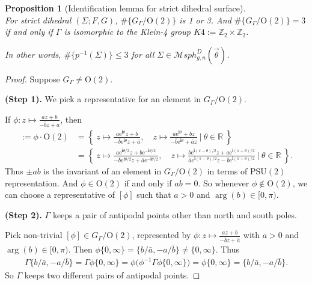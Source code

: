 \documentclass[pdflatex,sn-mathphys]{sn-jnl}%
\numberwithin{equation}{section}
\theoremstyle{thmstyleone}%
\newtheorem{proposition}[theorem]{Proposition}%
\newcommand{\RR}{\mathbb{R}}
\newcommand{\ZZ}{\mathbb{Z}}
\newcommand{\ii}{\mathbf{i}}
\newcommand{\PSUtwo}{\mathrm{PSU}(2)}
\newcommand{\Otwo}{\mathrm{O}(2)}
\newcommand{\MsphgnD}{\mathcal{M}sph^D_{g,n}(\vec{\theta})}
\begin{document}
\begin{proposition}[Identification lemma for strict dihedral surface]\label{prop:id_SDhd} ~\\
    For strict dihedral $(\Sigma;F,G)$, $\#\{ G_\Gamma/\Otwo \}$ is 1 or 3. And $\#\{ G_\Gamma/\Otwo \}=3$ if and only if $\Gamma$ is isomorphic to the Klein-4 group $K4:= \ZZ_2 \times \ZZ_2$.

    In other words, $\#\{p^{-1}(\Sigma)\} \leq 3$ for all $\Sigma\in\MsphgnD$.
\end{proposition}
\begin{proof}
    Suppose $G_\Gamma\neq \Otwo$.

\textbf{(Step 1).} We pick a representative for an element in $G_\Gamma/\Otwo$.

If $\phi:z\mapsto \frac{az+b}{-\bar{b}z+\bar{a}} $, then
\begin{align*}
    [\phi]:=\phi\cdot\Otwo &= \left\{\ z\mapsto \frac{a\mathrm{e}^{\ii\theta}z+b}{-\bar{b}\mathrm{e}^{\ii\theta}z+\bar{a}},\quad z\mapsto \frac{a\mathrm{e}^{\ii\theta}+bz}{-\bar{b}\mathrm{e}^{\ii\theta}+\bar{a}z} \ \bigg\rvert\ \theta\in\RR \ \right\} \\
    & = \left\{\ z\mapsto \frac{a\mathrm{e}^{\ii\theta/2}z+b\mathrm{e}^{-\ii\theta/2}}{-\bar{b}\mathrm{e}^{\ii\theta/2}z+\bar{a}\mathrm{e}^{-\ii\theta/2}},\quad z\mapsto \frac{b\mathrm{e}^{\ii(\pi-\theta)/2}z+a\mathrm{e}^{\ii(\pi+\theta)/2}}{\bar{a}\mathrm{e}^{\ii(\pi-\theta)/2}z-\bar{b}\mathrm{e}^{\ii(\pi+\theta)/2}} \ \bigg\rvert\ \theta\in\RR \ \right\}.
\end{align*}
Thus $\pm ab$ is the invariant of an element in $G_\Gamma/\Otwo$ in terms of $\PSUtwo$ representation. And $\phi\in\Otwo$ if and only if $ab=0$. So whenever $\phi\notin\Otwo$, we can choose a representative of $[\phi]$ such that $a>0$ and $\arg(b)\in[0,\pi)$.

\medskip
\textbf{(Step 2).} $\Gamma$ keeps a pair of antipodal points other than north and south poles.

Pick non-trivial $[\phi]\in G_\Gamma/\Otwo$, represented by $\phi:z\mapsto \frac{az+b}{-\bar{b}z+\bar{a}} $ with $a>0$ and $\arg(b)\in[0,\pi)$. Then $\phi\{0,\infty\} = \{b/\bar{a}, -a/\bar{b}\} \neq\{0,\infty\}$. Thus
\begin{align*}
    \Gamma\{b/\bar{a}, -a/\bar{b}\} = \Gamma\phi\{0,\infty\}    = \phi\big( \phi^{-1}\Gamma\phi\{0,\infty\} \big)
    = \phi\{0,\infty\} = \{b/\bar{a}, -a/\bar{b}\} .
\end{align*}
So $\Gamma$ keeps two different pairs of antipodal points.


\end{proof}
\end{document}
